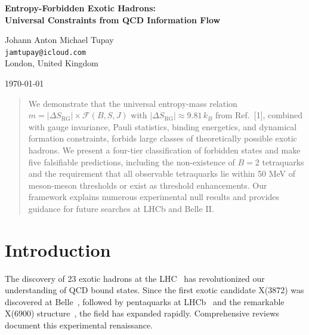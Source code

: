 \documentclass[12pt,a4paper]{article}
\begin{document}
\thispagestyle{empty}

\begin{center}
{\LARGE \textbf{Entropy-Forbidden Exotic Hadrons:\\[0.3em] Universal Constraints from QCD Information Flow}}

\vspace{1em}

{\large Johann Anton Michael Tupay}\\
\texttt{jamtupay@icloud.com}\\
London, United Kingdom

\vspace{1em}
{\large \today}
\end{center}

\vspace{1em}

\begin{abstract}
We demonstrate that the universal entropy-mass relation $m = |\Delta S_{\text{RG}}| \times \mathcal{F}(B,S,J)$ with $|\Delta S_{\text{RG}}| \approx 9.81\,k_B$ from Ref.~[1], combined with gauge invariance, Pauli statistics, binding energetics, and dynamical formation constraints, forbids large classes of theoretically possible exotic hadrons. We present a four-tier classification of forbidden states and make five falsifiable predictions, including the non-existence of $B=2$ tetraquarks and the requirement that all observable tetraquarks lie within 50 MeV of meson-meson thresholds or exist as threshold enhancements. Our framework explains numerous experimental null results and provides guidance for future searches at LHCb and Belle II.
\end{abstract}

\newpage
\setcounter{page}{1}
\pagestyle{fancy}

\section{Introduction}

The discovery of 23 exotic hadrons at the LHC~\cite{LHCb2022,CERN2024} has revolutionized our understanding of QCD bound states. Since the first exotic candidate X(3872) was discovered at Belle~\cite{Belle2003}, followed by pentaquarks at LHCb~\cite{LHCb2019} and the remarkable X(6900) structure~\cite{LHCb2020}, the field has expanded rapidly. Comprehensive reviews~\cite{Brambilla2020,Esposito2017,Ali2017} document this experimental renaissance. 
\end{document}
